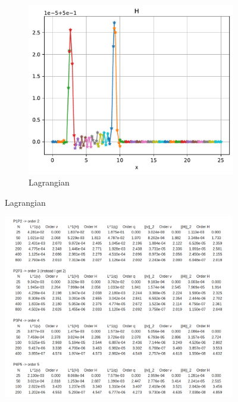 \documentclass[pt12]{beamer}
\begin{document}
\begin{frame}
\begin{figure}
\begin{subfigure}[b]{0.3\textwidth}
     \end{subfigure}
     \begin{subfigure}[b]{0.3\textwidth}
         \centering
         \includegraphics[width=\textwidth]{figures/lakeatrest/lagr.pdf}
     \caption{Lagrangian}
     \end{subfigure}
\end{figure}


\end{frame}




\begin{figure}
     \centering
         \includegraphics[width=0.9\textwidth]{figures/supercritical_smooth/conv.png}
\end{figure}
\end{document}

